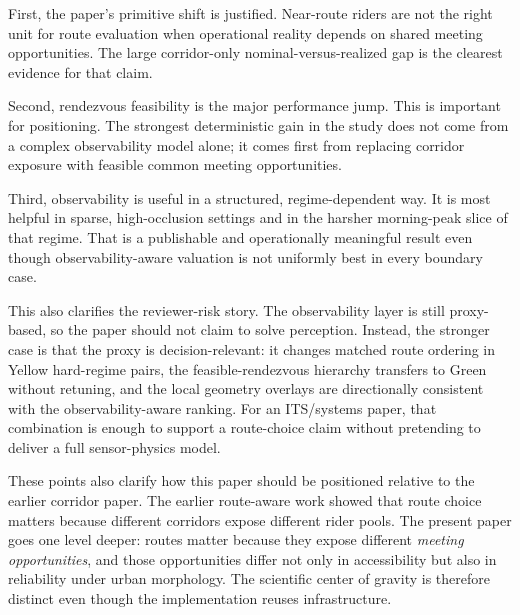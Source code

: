 \documentclass[journal]{IEEEtran}
\begin{document}
First, the paper's primitive shift is justified. Near-route riders are not the right unit for route evaluation when operational reality depends on shared meeting opportunities. The large corridor-only nominal-versus-realized gap is the clearest evidence for that claim.

Second, rendezvous feasibility is the major performance jump. This is important for positioning. The strongest deterministic gain in the study does not come from a complex observability model alone; it comes first from replacing corridor exposure with feasible common meeting opportunities.

Third, observability is useful in a structured, regime-dependent way. It is most helpful in sparse, high-occlusion settings and in the harsher morning-peak slice of that regime. That is a publishable and operationally meaningful result even though observability-aware valuation is not uniformly best in every boundary case.

This also clarifies the reviewer-risk story. The observability layer is still proxy-based, so the paper should not claim to solve perception. Instead, the stronger case is that the proxy is decision-relevant: it changes matched route ordering in Yellow hard-regime pairs, the feasible-rendezvous hierarchy transfers to Green without retuning, and the local geometry overlays are directionally consistent with the observability-aware ranking. For an ITS/systems paper, that combination is enough to support a route-choice claim without pretending to deliver a full sensor-physics model.

These points also clarify how this paper should be positioned relative to the earlier corridor paper. The earlier route-aware work showed that route choice matters because different corridors expose different rider pools. The present paper goes one level deeper: routes matter because they expose different \emph{meeting opportunities}, and those opportunities differ not only in accessibility but also in reliability under urban morphology. The scientific center of gravity is therefore distinct even though the implementation reuses infrastructure.
\end{document}

